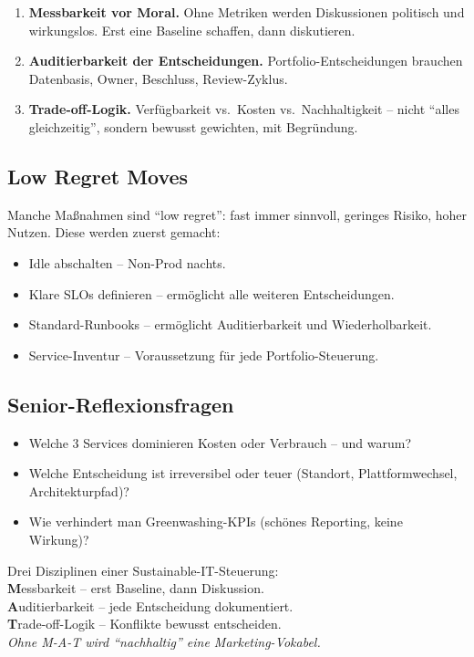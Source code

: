 \documentclass[11pt,a4paper,oneside]{article}
\newcommand{\caveatfontfallback}{\itshape}
\newcommand\caveatfont{\caveatfontfallback}%
\newcommand{\akzent}[1]{{\caveatfont\color{lpAmber}#1}}
\begin{document}
\begin{enumerate}
  \item \textbf{Messbarkeit vor Moral.} Ohne Metriken werden Diskussionen politisch und wirkungslos. Erst eine Baseline schaffen, dann diskutieren.
  \item \textbf{Auditierbarkeit der Entscheidungen.} Portfolio-Entscheidungen brauchen Datenbasis, Owner, Beschluss, Review-Zyklus.
  \item \textbf{Trade-off-Logik.} Verfügbarkeit vs.\ Kosten vs.\ Nachhaltigkeit -- nicht ``alles gleichzeitig'', sondern bewusst gewichten, mit Begründung.
\end{enumerate}

\subsection{Low Regret Moves}

Manche Maßnahmen sind ``low regret'': fast immer sinnvoll, geringes Risiko, hoher Nutzen. Diese werden zuerst gemacht:

\begin{itemize}
  \item Idle abschalten -- Non-Prod nachts.
  \item Klare SLOs definieren -- ermöglicht alle weiteren Entscheidungen.
  \item Standard-Runbooks -- ermöglicht Auditierbarkeit und Wiederholbarkeit.
  \item Service-Inventur -- Voraussetzung für jede Portfolio-Steuerung.
\end{itemize}

\subsection{Senior-Reflexionsfragen}

\begin{itemize}
  \item Welche 3 Services dominieren Kosten oder Verbrauch -- und warum?
  \item Welche Entscheidung ist irreversibel oder teuer (Standort, Plattformwechsel, Architekturpfad)?
  \item Wie verhindert man Greenwashing-KPIs (schönes Reporting, keine Wirkung)?
\end{itemize}

\begin{eselsbox}[Eselsbrücke: \akzent{M-A-T}]
Drei Disziplinen einer Sustainable-IT-Steuerung:\\[2pt]
\textbf{M}essbarkeit -- erst Baseline, dann Diskussion.\\
\textbf{A}uditierbarkeit -- jede Entscheidung dokumentiert.\\
\textbf{T}rade-off-Logik -- Konflikte bewusst entscheiden.\\[2pt]
\emph{Ohne M-A-T wird ``nachhaltig'' eine Marketing-Vokabel.}
\end{eselsbox}
\end{document}
